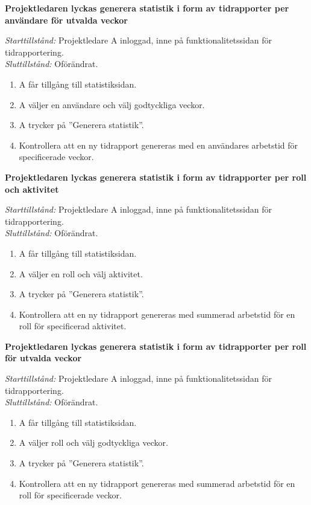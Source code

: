 \documentclass[a4paper]{article}
\begin{document}
\begin{FT}
\item
\textbf{Projektledaren lyckas generera statistik i form av tidrapporter per användare för utvalda veckor}

\emph{Starttillstånd:} Projektledare A inloggad, inne på funktionalitetssidan för tidrapportering.\\
\emph{Sluttillstånd:} Oförändrat.

\begin{enumerate}
\item A får tillgång till statistiksidan.
\item A väljer en användare och välj godtyckliga veckor.
\item A trycker på ''Generera statistik''.
\item Kontrollera att en ny tidrapport genereras med en användares arbetstid för specificerade veckor.
\end{enumerate}


\item
\textbf{Projektledaren lyckas generera statistik i form av tidrapporter per roll och aktivitet}

\emph{Starttillstånd:} Projektledare A inloggad, inne på funktionalitetssidan för tidrapportering.\\
\emph{Sluttillstånd:} Oförändrat.

\begin{enumerate}
\item A får tillgång till statistiksidan.
\item A väljer en roll och välj aktivitet.
\item A trycker på ''Generera statistik''.
\item Kontrollera att en ny tidrapport genereras med summerad arbetstid för en roll för specificerad aktivitet.
\end{enumerate}


\item
\textbf{Projektledaren lyckas generera statistik i form av tidrapporter per roll för utvalda veckor}

\emph{Starttillstånd:} Projektledare A inloggad, inne på funktionalitetssidan för tidrapportering.\\
\emph{Sluttillstånd:} Oförändrat.

\begin{enumerate}
\item A får tillgång till statistiksidan.
\item A väljer roll och välj godtyckliga veckor.
\item A trycker på ''Generera statistik''.
\item Kontrollera att en ny tidrapport genereras med summerad arbetstid för en roll för specificerade veckor.
\end{enumerate}



\end{FT}
\end{document}
